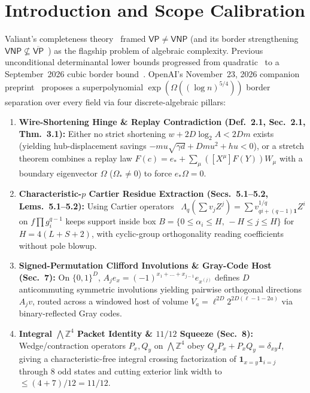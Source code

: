 \documentclass[10pt,twocolumn]{article}
\newcommand{\ZZ}{\mathbb{Z}}
\begin{document}
\section{Introduction and Scope Calibration}\label{sec:intro}
Valiant's completeness theory~\cite{valiant1979completeness} framed $\mathsf{VP}\neq\mathsf{VNP}$ (and its border strengthening $\mathsf{VNP}\not\subseteq\overline{\mathsf{VP}}$~\cite{burgisser2004complexity}) as the flagship problem of algebraic complexity. Previous unconditional determinantal lower bounds progressed from quadratic~\cite{mignon2004quadratic,cai2010quadratic} to a September~2026 cubic border bound~\cite{openai2026cubic}. OpenAI's November~23, 2026 companion preprint~\cite{openai2026vpvnp} proposes a superpolynomial $\exp(\Omega((\log n)^{5/4}))$ border separation over every field via four discrete-algebraic pillars:
\begin{enumerate}[leftmargin=1.2em,itemsep=1pt,topsep=2pt]
  \item \textbf{Wire-Shortening Hinge \& Replay Contradiction (Def.~2.1, Sec.~2.1, Thm.~3.1):} Either no strict shortening $w+2D\log_2 A < 2Dm$ exists (yielding hub-displacement savings $-mu\sqrt{\gamma d}+Dmu^2+hu<0$), or a stretch theorem combines a replay law $F(c)=e_*+\sum_\mu([X^\mu]F(Y))W_\mu$ with a boundary eigenvector $\Omega$ ($\Omega_*\ne 0$) to force $e_*\Omega=0$.
  \item \textbf{Characteristic-$p$ Cartier Residue Extraction (Secs.~5.1--5.2, Lems.~5.1--5.2):} Using Cartier operators~\cite{cartier1957nouvelle,stohr1987formula} $\Lambda_q(\sum v_j Z^j)=\sum v_{qi+(q-1)\mathbf{1}}^{1/q}Z^i$ on $f\prod g_i^{q-1}$ keeps support inside box $B=\{0\le\alpha_i\le H,\,-H\le j\le H\}$ for $H=4(L+S+2)$, with cyclic-group orthogonality reading coefficients without pole blowup.
  \item \textbf{Signed-Permutation Clifford Involutions \& Gray-Code Host (Sec.~7):} On $\{0,1\}^D$, $A_j e_x=(-1)^{x_1+\dots+x_{j-1}}e_{x^{(j)}}$ defines $D$ anticommuting symmetric involutions yielding pairwise orthogonal directions $A_j v$, routed across a windowed host of volume $V_a=\ell^{2D}2^{2D(\ell-1-2a)}$ via binary-reflected Gray codes.
  \item \textbf{Integral $\bigwedge\ZZ^4$ Packet Identity \& $11/12$ Squeeze (Sec.~8):} Wedge/contraction operators $P_x,Q_y$ on $\bigwedge\ZZ^4$ obey $Q_y P_x + P_x Q_y = \delta_{xy}I$, giving a characteristic-free integral crossing factorization of $\mathbf{1}_{x=y}\mathbf{1}_{i=j}$ through 8 odd states and cutting exterior link width to $\le (4+7)/12 = 11/12$.
\end{enumerate}
\end{document}
